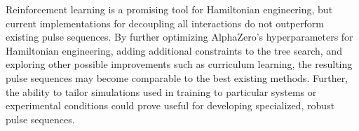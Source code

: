 \documentclass{article}
\begin{document}
Reinforcement learning is a promising tool for Hamiltonian engineering, but current implementations for decoupling all interactions do not outperform existing pulse sequences. By further optimizing AlphaZero's hyperparameters for Hamiltonian engineering, adding additional constraints to the tree search, and exploring other possible improvements such as curriculum learning, the resulting pulse sequences may become comparable to the best existing methods. Further, the ability to tailor simulations used in training to particular systems or experimental conditions could prove useful for developing specialized, robust pulse sequences.

\printbibliography
\end{document}
